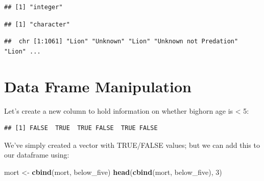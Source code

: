 \documentclass[
]{book}
\newenvironment{Shaded}{\begin{snugshade}}{\end{snugshade}}
\newcommand{\DecValTok}[1]{\textcolor[rgb]{0.00,0.00,0.81}{#1}}
\newcommand{\FunctionTok}[1]{\textcolor[rgb]{0.13,0.29,0.53}{\textbf{#1}}}
\newcommand{\NormalTok}[1]{#1}
\newcommand{\OtherTok}[1]{\textcolor[rgb]{0.56,0.35,0.01}{#1}}
\newcommand{\SpecialCharTok}[1]{\textcolor[rgb]{0.81,0.36,0.00}{\textbf{#1}}}
\begin{document}
\begin{verbatim}
## [1] "integer"
\end{verbatim}

\begin{Shaded}
\end{Shaded}

\begin{verbatim}
## [1] "character"
\end{verbatim}

\begin{Shaded}
\end{Shaded}

\begin{verbatim}
##  chr [1:1061] "Lion" "Unknown" "Lion" "Unknown not Predation" "Lion" ...
\end{verbatim}

\section{Data Frame Manipulation}\label{data-frame-manipulation}

Let's create a new column to hold information on whether bighorn age is \textless{} 5:

\begin{Shaded}
\end{Shaded}

\begin{verbatim}
## [1] FALSE  TRUE  TRUE FALSE  TRUE FALSE
\end{verbatim}

We've simply created a vector with TRUE/FALSE values; but we can add this to our dataframe using:

\begin{Shaded}
\begin{Highlighting}[]
\NormalTok{mort }\OtherTok{\textless{}{-}} \FunctionTok{cbind}\NormalTok{(mort, below\_five)}
\FunctionTok{head}\NormalTok{(}\FunctionTok{cbind}\NormalTok{(mort, below\_five), }\DecValTok{3}\NormalTok{)}
\end{Highlighting}
\end{Shaded}
\end{document}

